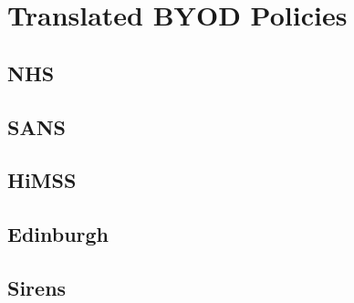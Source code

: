 \documentclass[phd,lfcs,notimes,openright]{infthesis}
\begin{document}








\appendix
\chapter{Translated BYOD Policies}
\label{appendix:byod}
\section{NHS}

\section{SANS}

\section{HiMSS}

\section{Edinburgh}

\section{Sirens}




%
\singlespace


\end{document}
